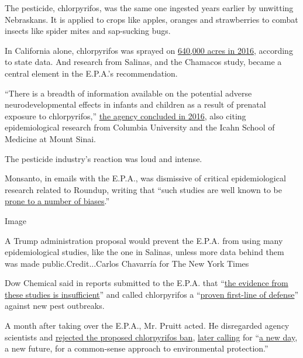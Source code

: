 The pesticide, chlorpyrifos, was the same one ingested years earlier by
unwitting Nebraskans. It is applied to crops like apples, oranges and
strawberries to combat insects like spider mites and sap-sucking bugs.

In California alone, chlorpyrifos was sprayed on
\href{https://www.cdpr.ca.gov/docs/pur/pur16rep/chmrpt16.pdf}{640,000
acres in 2016}, according to state data. And research from Salinas, and
the Chamacos study, became a central element in the E.P.A.'s
recommendation.

``There is a breadth of information available on the potential adverse
neurodevelopmental effects in infants and children as a result of
prenatal exposure to chlorpyrifos,''
\href{https://www.documentcloud.org/documents/4641119-2016-11-03-EPA-Chlorpyrifos-Revised-Human-Health.html}{the
agency concluded in 2016}, also citing epidemiological research from
Columbia University and the Icahn School of Medicine at Mount Sinai.

The pesticide industry's reaction was loud and intense.

Monsanto, in emails with the E.P.A., was dismissive of critical
epidemiological research related to Roundup, writing that ``such studies
are well known to be
\href{https://www.documentcloud.org/documents/4641181-Page1703.html}{prone
to a number of biases}.''

Image

A Trump administration proposal would prevent the E.P.A. from using many
epidemiological studies, like the one in Salinas, unless more data
behind them was made public.Credit...Carlos Chavarría for The New York
Times

Dow Chemical said in reports submitted to the E.P.A. that
``\href{https://www.documentcloud.org/documents/4641129-2014-9-Dow-on-EPIDE-Pages-From-PANNA-MERGED.html}{the
evidence from these studies is insufficient}'' and called chlorpyrifos a
``\href{https://www.documentcloud.org/documents/4641128-2017-1-16-Dow-Petition-Mass-Comment-Campaign.html}{proven
first-line of defense}'' against new pest outbreaks.

A month after taking over the E.P.A., Mr. Pruitt acted. He disregarded
agency scientists and
\href{https://www.nytimes3xbfgragh.onion/2017/03/29/us/politics/epa-insecticide-chlorpyrifos.html}{rejected
the proposed chlorpyrifos ban},
\href{https://www.nytimes3xbfgragh.onion/2017/08/18/us/politics/epa-agriculture-industry.html}{later
calling} for
``\href{https://www.documentcloud.org/documents/3935290-EPA-HQ-2017-005731-Redacted.html\#document/p32/a369099}{a
new day}, a new future, for a common-sense approach to environmental
protection.''

